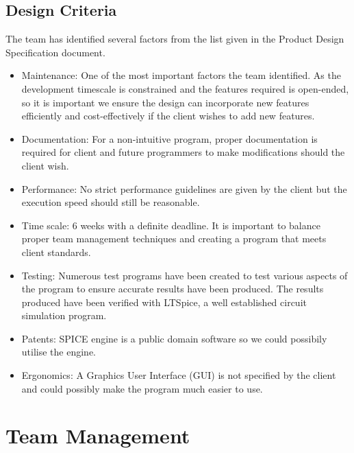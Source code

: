\documentclass[12pt,a4paper]{article}
\begin{document}
	\subsection{Design Criteria}
	The team has identified several factors from the list given in the Product Design Specification document.
	\begin{itemize}
		\item Maintenance: One of the most important factors the team identified. As the development timescale is 
		constrained and the features required is open-ended, so it is important we ensure the design can 
		incorporate new features efficiently and cost-effectively if the client wishes to add new features.
		\item Documentation: For a non-intuitive program, proper documentation is required for client and future
		programmers to make modifications should the client wish.
		\item Performance: No strict performance guidelines are given by the client but the execution 
		speed should still be reasonable. 
		\item Time scale: 6 weeks with a definite deadline. It is important to balance proper team management
		techniques and creating a program that meets client standards.
		\item Testing: Numerous test programs have been created to test various aspects of the program to ensure
		accurate results have been produced. The results produced have been verified with LTSpice, a well 
		established circuit simulation program.
		\item Patents: SPICE engine is a public domain software so we could possibily utilise the engine.
		\item Ergonomics: A Graphics User Interface (GUI) is not specified by the client and could possibly 
		make the program much easier to use.
	\end{itemize}
	\vfill
	\pagebreak

\section{Team Management}
\end{document}
